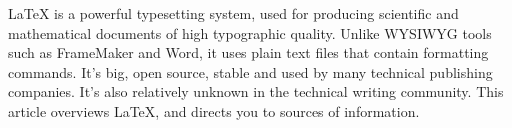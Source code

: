 \documentclass[12pt]{article}
\begin{document}
LaTeX is a powerful typesetting system, used
for producing scientific and mathematical
documents of high typographic quality. Unlike
WYSIWYG tools such as FrameMaker and Word,
it uses plain text files that contain formatting
commands. It’s big, open source, stable and used
by many technical publishing companies. It’s
also relatively unknown in the technical writing
community. This article overviews LaTeX, and
directs you to sources of information.
\end{document}
